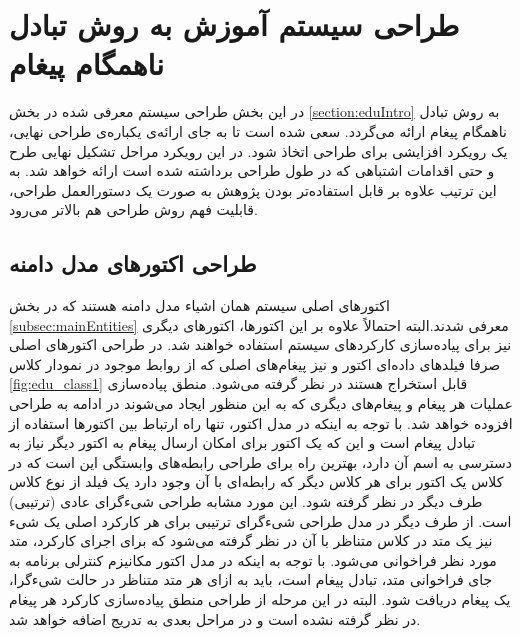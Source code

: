 \newpage
\section{طراحی سیستم آموزش به روش تبادل ناهمگام پیغام}
در این بخش طراحی سیستم معرفی شده در بخش \ref{section:eduIntro} به روش تبادل ناهمگام پیغام ارائه می‌گردد. سعی شده است تا به جای ارائه‌ی یکباره‌ی طراحی نهایی، یک رویکرد \gls{افزایشی} برای طراحی اتخاذ شود. در این رویکرد مراحل تشکیل نهایی طرح و حتی اقدامات اشتباهی که در طول طراحی برداشته شده است ارائه خواهد شد. به  این ترتیب علاوه بر قابل استفاده‌تر بودن پژوهش به صورت یک دستورالعمل  طراحی، قابلیت فهم روش طراحی هم بالاتر می‌رود.
\subsection{طراحی اکتور‌های مدل دامنه}
اکتورهای اصلی سیستم همان اشیاء مدل دامنه هستند که در بخش \ref{subsec:mainEntities} معرفی شدند.البته احتمالاً علاوه بر این اکتورها، اکتورهای دیگری نیز برای پیاده‌سازی کارکردهای سیستم استفاده خواهند شد. در طراحی اکتورهای اصلی صرفا فیلد‌های داده‌ای اکتور و نیز پیغام‌های اصلی که از روابط موجود در نمودار کلاس \ref{fig:edu_class1} قابل استخراج هستند در نظر گرفته ‌می‌شود. منطق پیاده‌سازی عملیات هر پیغام و  پیغام‌های دیگری که به این منظور ایجاد می‌شوند در ادامه به طراحی افزوده خواهد شد. 
با توجه به اینکه در مدل اکتور،‌ تنها راه ارتباط بین اکتور‌ها استفاده از تبادل پیغام است و این که یک اکتور برای امکان ارسال پیغام به اکتور دیگر نیاز به دسترسی به اسم آن دارد، بهترین راه برای طراحی رابطه‌های وابستگی این است که در کلاس یک اکتور برای هر کلاس دیگر که رابطه‌ای با آن وجود دارد یک فیلد از نوع کلاس طرف دیگر در نظر گرفته شود. این مورد مشابه طراحی شیءگرای عادی (ترتیبی) است. از طرف دیگر در مدل طراحی شیءگرای ترتیبی برای هر کارکرد اصلی یک شیء نیز یک متد در کلاس متناظر با آن در نظر گرفته می‌شود که برای اجرای کارکرد، متد مورد نظر فراخوانی می‌شود. با توجه به اینکه در مدل اکتور مکانیزم کنترلی برنامه به جای فراخوانی متد، تبادل پیغام است، باید به ازای هر متد متناظر در حالت شیءگرا، یک پیغام دریافت شود. البته در این مرحله از طراحی منطق پیاده‌سازی کارکرد هر پیغام در نظر گرفته نشده است و در مراحل بعدی به تدریج اضافه خواهد شد.
